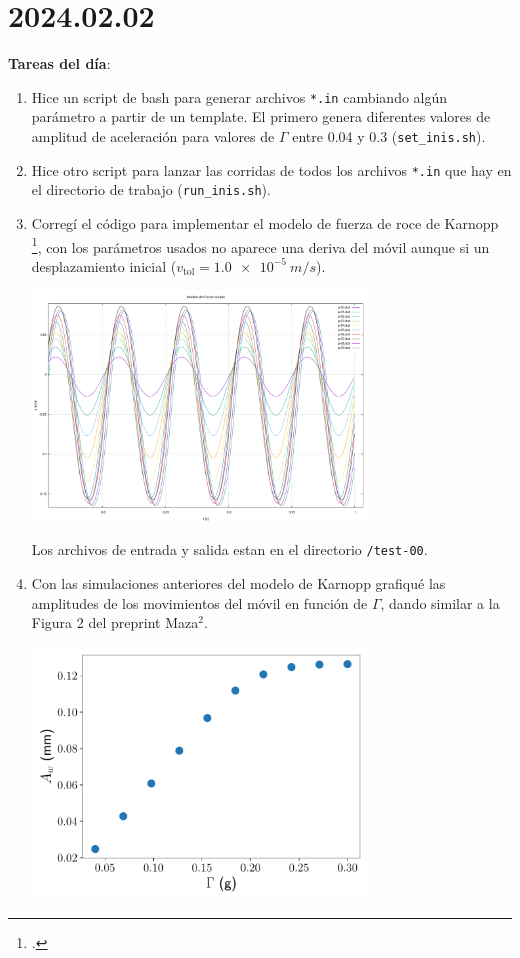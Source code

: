 \documentclass[11pt]{article}
\begin{document}
\section*{2024.02.02}

\textbf{Tareas del día}:
\begin{enumerate}
    \item Hice un script de bash para generar archivos \texttt{*.in} cambiando algún parámetro a partir de un template. El primero genera diferentes valores de amplitud de aceleración para valores de $\Gamma$ entre 0.04 y 0.3 (\texttt{set\_inis.sh}).
    \item Hice otro script para lanzar las corridas de todos los archivos \texttt{*.in} que hay en el directorio de trabajo (\texttt{run\_inis.sh}).
    \item Corregí el código para implementar el modelo de fuerza de roce de Karnopp \footcite{marques2016}, con los parámetros usados no aparece una deriva del móvil aunque si un desplazamiento inicial ($v_{\text{tol}} = \qty{1.0e-5}{m/s}$).
        \begin{center}
            \includegraphics[width=0.7\textwidth]{figs/fig-000.pdf}
        \end{center}
        Los archivos de entrada y salida estan en el directorio \texttt{/test-00}.
\item Con las simulaciones anteriores del modelo de Karnopp grafiqué las amplitudes de los movimientos del móvil en función de $\Gamma$, dando similar a la Figura 2 del preprint Maza$^2$.
        \begin{center}
            \includegraphics[width=0.7\textwidth]{figs/Fig_2_karnopp.pdf}
        \end{center}
\end{enumerate}
\end{document}
